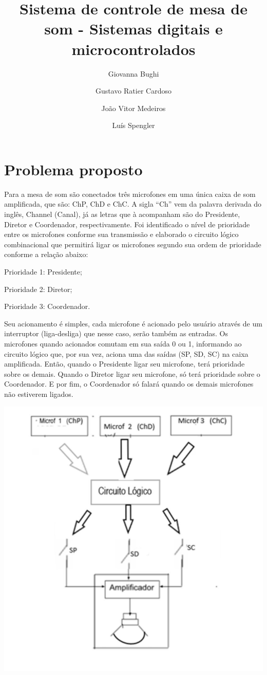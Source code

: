 \documentclass{article}
\title{Sistema de controle de mesa de som - Sistemas digitais e microcontrolados}
\date{}
\author[1]{Giovanna Bughi}
\author[2]{Gustavo Ratier Cardoso}
\author[3]{João Vitor Medeiros}
\author[4]{Luís Spengler}
\affil[1,2,3,4]{Instituto Federal de Educação, Ciência e Tecnologia de Mato Grosso do Sul}
\begin{document}
\maketitle

\tableofcontents

\medskip

\section{Problema proposto}
Para a mesa de som são conectados três microfones em uma única caixa de som amplificada, que são: ChP, ChD e ChC. A sigla “Ch” vem da palavra derivada do inglês, Channel (Canal), já as letras que à acompanham são do Presidente, Diretor e Coordenador, respectivamente. Foi identificado o nível de prioridade entre os microfones conforme sua transmissão e elaborado o circuito lógico combinacional que permitirá ligar os microfones segundo sua ordem de prioridade conforme a relação abaixo:

Prioridade 1: Presidente;

Prioridade 2: Diretor;

Prioridade 3: Coordenador.

Seu acionamento é simples, cada microfone é acionado pelo usuário através de um interruptor (liga-desliga) que nesse caso, serão também as entradas. Os microfones quando acionados comutam em sua saída 0 ou 1, informando ao circuito lógico que, por sua vez, aciona uma das saídas (SP, SD, SC) na caixa amplificada. Então, quando o Presidente ligar seu microfone, terá prioridade sobre os demais. Quando o Diretor ligar seu microfone, só terá prioridade sobre o Coordenador. E por fim, o Coordenador só falará quando os demais microfones não estiverem ligados.

\includegraphics[width=\textwidth]{esbocoroubado}
\end{document}
